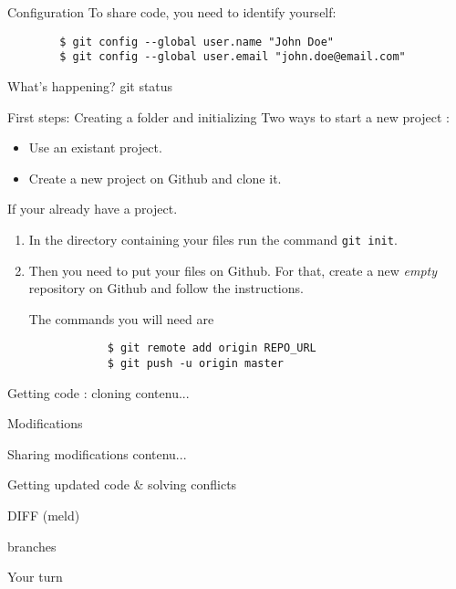 \documentclass{beamer}
\begin{document}
	\begin{frame}[fragile]{Configuration}
	To share code, you need to identify yourself:
	\begin{verbatim}
		$ git config --global user.name "John Doe"
		$ git config --global user.email "john.doe@email.com"
	\end{verbatim}
	\end{frame}

	\begin{frame}{What's happening?}
		git status
	\end{frame}
	\begin{frame}[fragile]{First steps: Creating a folder and initializing}
		Two ways to start a new project : 
		\begin{itemize}
			\item Use an existant project. 
			\item Create a new project on Github and clone it. \newline
		\end{itemize}
	
		If your already have a project.
		\begin{enumerate}
		\item  In the directory containing your files run the command 
		\texttt{git init}.
		
		\item  Then you need to put your files on Github. For that, create a new \emph{empty} repository on Github and follow the instructions.
		
		The commands you will need are 
		\begin{verbatim}
			$ git remote add origin REPO_URL
			$ git push -u origin master
		\end{verbatim}
		
		\end{enumerate}   
	\end{frame}
	\begin{frame}{Getting code : cloning}
		contenu...
	\end{frame}
	\begin{frame}{Modifications}
		
	\end{frame}
	\begin{frame}{Sharing modifications}
		contenu...
	\end{frame}
	\begin{frame}{Getting updated code \& solving conflicts}
	
	\end{frame}
	\begin{frame}
		DIFF (meld)
	\end{frame}
	\begin{frame}
		branches
	\end{frame}
	\begin{frame}
		Your turn
	\end{frame}	
\end{document}
